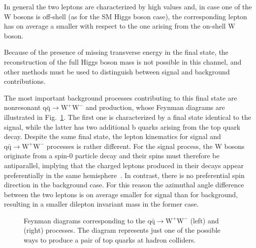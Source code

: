 In general the two leptons are characterized by high \pt values and, in case one of the W bosons is off-shell (as for the SM Higgs boson case), the corresponding lepton has on average a smaller \pt with respect to the one arising from the on-shell W boson.

Because of the presence of missing transverse energy in the final state, the reconstruction of the full Higgs boson mass is not possible in this channel, and other methods must be used to distinguish between signal and background contributions.

The most important background processes contributing to this final state are nonresonant $\mathrm{q\bar q \to W^+W^-}$ and \ttbar production, whose Feynman diagrams are illustrated in Fig.~\ref{fig:wwandtop}. The first one is characterized by a final state identical to the signal, while the latter has two additional b quarks arising from the top quark decay. Despite the same final state, the lepton kinematics for signal and $\mathrm{q\bar q \to W^+W^-}$ processes is rather different. For the signal process, the W bosons originate from a spin-0 particle decay and their spins must therefore be antiparallel, implying that the charged leptons produced in their decays appear preferentially in the same hemisphere~\cite{Ellis:2012wg}. In contrast, there is no preferential spin direction in the background case.
For this reason the azimuthal angle difference between the two leptons is on average smaller for signal than for background, resulting in a smaller dilepton invariant mass in the former case.

\begin{figure}[htb]
\centering
{}
\caption{Feynman diagrams corresponding to the $\mathrm{q\bar q \to W^+W^-}$ (left) and \ttbar (right) processes. The \ttbar diagram represents just one of the possible ways to produce a pair of top quarks at hadron colliders.}\label{fig:wwandtop}
\end{figure}

